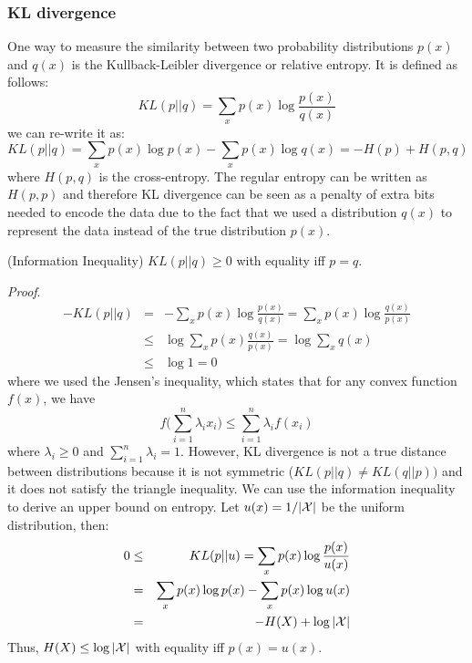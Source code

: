 \subsubsection{KL divergence}

One way to measure the similarity between two probability distributions $p(x)$ and $q(x)$ is the Kullback-Leibler divergence or relative entropy. It is defined as follows:
\begin{equation}
    KL(p||q) = \sum_x p(x) \log \frac{p(x)}{q(x)}
\end{equation}
we can re-write it as:
\begin{equation}
    KL(p||q) = \sum_x p(x)\log p(x) - \sum_x p(x)\log q(x) = -H(p) + H(p,q)
\end{equation}
where $H(p,q)$ is the cross-entropy. The regular entropy can be written as $H(p,p)$ and therefore KL divergence can be seen as a penalty of extra bits needed to encode the data due to the fact that we used a distribution $q(x)$ to represent the data instead of the true distribution $p(x)$. 
\begin{theorem}
 (Information Inequality) $KL(p||q)\geq 0$ with equality iff $p = q$. 
\end{theorem}
\textit{Proof}.
\begin{eqnarray}
    -KL(p||q) &=& -\sum_x p(x) \log \frac{p(x)}{q(x)} = \sum_x p(x)\log \frac{q(x)}{p(x)} \\
              &\leq& \log \sum_x p(x) \frac{q(x)}{p(x)} = \log \sum_x q(x)\\
              &\leq& \log 1 = 0
\end{eqnarray}
where we used the Jensen's inequality, which states that for any convex function $f(x)$, we have
\begin{equation}
    f\bigg(\sum_{i=1}^{n}\lambda_i x_i \bigg) \leq \sum_{i=1}^{n} \lambda_i f(x_i)
\end{equation}
where $\lambda_i \geq 0$ and $\sum_{i=1}^{n}\lambda_i = 1$.
However, KL divergence is not a true distance between distributions because it is not symmetric ($KL(p||q) \neq KL(q||p))$ and it does not satisfy the triangle inequality. We can use the information inequality to derive an upper bound on entropy. Let $u(x) = 1/|\cal X|$ be the uniform distribution, then:
\begin{eqnarray}
    0 &\leq& KL(p||u) = \sum_x p(x)\log \frac{p(x)}{u(x)} \\
      &=& \sum_x p(x)\log p(x) - \sum_x p(x)\log u(x) \\
      &=& -H(X) + \log |\cal X|
\end{eqnarray}
Thus, $H(X) \leq \log |\cal X|$ with equality iff $p(x) = u(x)$. 

